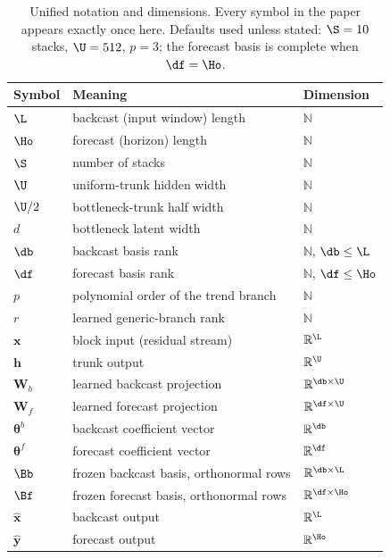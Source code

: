 \begin{table}[t]
\centering
\small
\caption{Unified notation and dimensions. Every symbol in the paper appears exactly once here.
Defaults used unless stated: $\S = 10$ stacks, $\U = 512$, $p = 3$; the forecast basis is
complete when $\df = \Ho$.}
\label{tab:dims}
\begin{tabular}{@{}lll@{}}
\toprule
Symbol & Meaning & Dimension \\
\midrule
$\L$ & backcast (input window) length & $\mathbb{N}$ \\
$\Ho$ & forecast (horizon) length & $\mathbb{N}$ \\
$\S$ & number of stacks & $\mathbb{N}$ \\
$\U$ & uniform-trunk hidden width & $\mathbb{N}$ \\
$\U/2$ & bottleneck-trunk half width & $\mathbb{N}$ \\
$d$ & bottleneck latent width & $\mathbb{N}$ \\
$\db$ & backcast basis rank & $\mathbb{N}$, $\db \le \L$ \\
$\df$ & forecast basis rank & $\mathbb{N}$, $\df \le \Ho$ \\
$p$ & polynomial order of the trend branch & $\mathbb{N}$ \\
$r$ & learned generic-branch rank & $\mathbb{N}$ \\
$\mathbf{x}$ & block input (residual stream) & $\mathbb{R}^{\L}$ \\
$\mathbf{h}$ & trunk output & $\mathbb{R}^{\U}$ \\
$\mathbf{W}_{b}$ & learned backcast projection & $\mathbb{R}^{\db \times \U}$ \\
$\mathbf{W}_{f}$ & learned forecast projection & $\mathbb{R}^{\df \times \U}$ \\
$\boldsymbol{\theta}^{b}$ & backcast coefficient vector & $\mathbb{R}^{\db}$ \\
$\boldsymbol{\theta}^{f}$ & forecast coefficient vector & $\mathbb{R}^{\df}$ \\
$\Bb$ & frozen backcast basis, orthonormal rows & $\mathbb{R}^{\db \times \L}$ \\
$\Bf$ & frozen forecast basis, orthonormal rows & $\mathbb{R}^{\df \times \Ho}$ \\
$\hat{\mathbf{x}}$ & backcast output & $\mathbb{R}^{\L}$ \\
$\hat{\mathbf{y}}$ & forecast output & $\mathbb{R}^{\Ho}$ \\
\bottomrule
\end{tabular}
\end{table}

